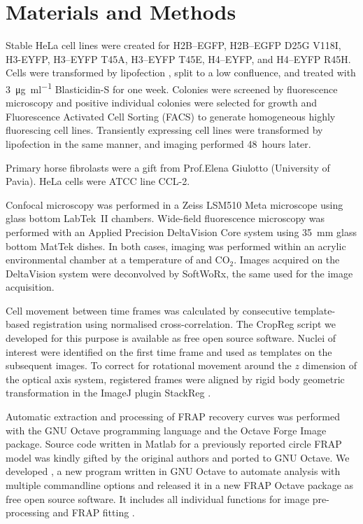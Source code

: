 \section{Materials and Methods}

  Stable HeLa cell lines were created for H2B--EGFP, H2B--EGFP D25G V118I,
  H3-EYFP, H3--EYFP T45A, H3--EYFP T45E, H4--EYFP, and H4--EYFP R45H.
  Cells were transformed by lipofection ,
  split to a low confluence, and treated
  with \SI{3}{\ug\per\ml} \mbox{Blasticidin-S} for one week.
  Colonies were screened by fluorescence microscopy
  and positive individual colonies were selected for growth
  and Fluorescence Activated Cell Sorting (FACS) to generate
  homogeneous highly fluorescing cell lines.
  Transiently expressing cell lines were transformed by lipofection in
  the same manner, and imaging performed 48~hours later.

  Primary horse fibrolasts were a gift from Prof.\@ Elena Giulotto
  (University of Pavia). HeLa cells were ATCC line CCL-2.

  Confocal microscopy was performed in a Zeiss LSM510 Meta microscope
  using glass bottom LabTek~II chambers.  Wide-field fluorescence
  microscopy was performed with an Applied Precision DeltaVision Core
  system using \SI{35}{\mm} glass bottom MatTek dishes.  In both
  cases, imaging was performed within an acrylic environmental chamber
  at a temperature of  and  CO$_2$.
  Images acquired on the DeltaVision system were deconvolved by
  SoftWoRx, the same used for the image acquisition.


  Cell movement between time frames was calculated by consecutive
  template-based registration using normalised cross-correlation.
  The CropReg script we developed for this purpose is available
  as free open source software. Nuclei of interest were identified
  on the first time frame and used as templates on the subsequent images.
  To correct for rotational movement
  around the $z$ dimension of the optical axis system,
  registered frames were aligned by rigid body geometric transformation
  in the ImageJ \citep{imagej1} plugin StackReg \citep{stackreg}.

  Automatic extraction and processing of FRAP recovery curves was
  performed with the GNU Octave programming language \citep{octave}
  and the Octave Forge Image package.  Source code written in Matlab
  for a previously reported circle FRAP model \citep{mcnally-frap-code}
  was kindly gifted by the original authors and ported to GNU Octave.
  We developed , a new program written in GNU Octave
  to automate analysis with multiple commandline options
  and released it in a new FRAP Octave package as free open source software.
  It includes all individual functions for image
  pre-processing and FRAP fitting .
